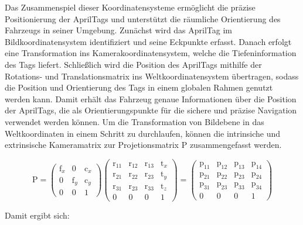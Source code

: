 \documentclass[ngerman]{article}    %
\theoremstyle{definition}
\begin{document}
Das Zusammenspiel dieser Koordinatensysteme ermöglicht die präzise Positionierung der AprilTags und unterstützt die räumliche Orientierung des Fahrzeugs in seiner Umgebung. Zunächst wird das AprilTag im Bildkoordinatensystem identifiziert und seine Eckpunkte erfasst. Danach erfolgt eine Transformation ins Kamerakoordinatensystem, welche die Tiefeninformation des Tags liefert. Schließlich wird die Position des AprilTags mithilfe der Rotations- und Translationsmatrix ins Weltkoordinatensystem übertragen, sodass die Position und Orientierung des Tags in einem globalen Rahmen genutzt werden kann. Damit erhält das Fahrzeug genaue Informationen über die Position der AprilTags, die als Orientierungspunkte für die sichere und präzise Navigation verwendet werden können. Um die Transformation von Bildebene in das Weltkoordinaten in einem Schritt zu durchlaufen, können die intrinsiche und extrinsische Kameramatrix zur Projetionsmatrix $\text{P}$ zusammengefasst werden. 

\begin{equation}
    \text{P} = \begin{pmatrix}
         \text{f}_x & 0 & \text{c}_x \\ 0 & \text{f}_y & \text{c}_y \\ 0 & 0 & 1 
    \end{pmatrix}
    \begin{pmatrix}
        \text{r}_{11} & \text{r}_{12} & \text{r}_{13} & \text{t}_x \\
        \text{r}_{21} & \text{r}_{22} & \text{r}_{23} & \text{t}_y \\
        \text{r}_{31} & \text{r}_{23} & \text{r}_{33} & \text{t}_z \\
        0 & 0 & 0 & 1
    \end{pmatrix}
    = 
   \begin{pmatrix}
        \text{p}_{11} & \text{p}_{12} & \text{p}_{13} & \text{p}_{14} \\
        \text{p}_{21} & \text{p}_{22} & \text{p}_{23} & \text{p}_{24} \\
        \text{p}_{31} & \text{p}_{23} & \text{p}_{33} & \text{p}_{34} \\
        0 & 0 & 0 & 1
    \end{pmatrix} 
\end{equation}

\newpage
Damit ergibt sich:
\end{document}

